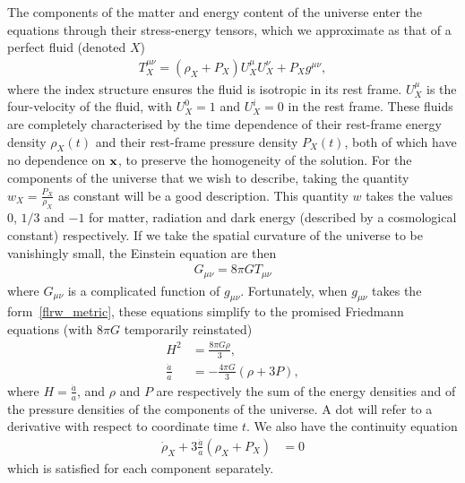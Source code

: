     The components of the matter and energy content of the universe enter the equations through
    their stress-energy tensors, which we approximate as that of
    a perfect fluid (denoted $X$)
    \begin{align}
        T_X^{\mu\nu} = (\rho_X+P_X)U_X^\mu U_X^\nu+P_Xg^{\mu\nu},
    \end{align}
    where the index structure ensures the fluid is isotropic in its rest frame.
    $U_X^\mu$ is the four-velocity of the fluid, with $U_X^0=1$ and $U_X^i=0$
    in the rest frame.
    These fluids are completely characterised by the time dependence
    of their rest-frame energy density $\rho_X(t)$ and their rest-frame
    pressure density $P_X(t)$,
    both of which have no dependence on $\mathbf{x}$, to preserve the homogeneity of the solution.
    For the components of the universe that we wish to describe,
    taking the quantity $w_X=\frac{P_X}{\rho_X}$ as constant will be a good description.
    This quantity $w$ takes the values $0$, $1/3$ and $-1$ for matter, radiation
    and dark energy (described by a cosmological constant) respectively.
    If we take the spatial curvature of the universe to be vanishingly small,
    the Einstein equation are then
    \begin{align}\label{einstein_equations}
        G_{\mu\nu} = 8\pi G T_{\mu\nu}
    \end{align}
    where $G_{\mu\nu}$ is a complicated function of $g_{\mu\nu}$.
    Fortunately, when $g_{\mu\nu}$ takes the form~\eqref{flrw_metric},
    these equations simplify to the promised Friedmann equations
    (with $8\pi G$ temporarily reinstated)
    \begin{align}\label{friedmann_1}
        H^2 &= \frac{8\pi G \rho}{3},\\
        \frac{\ddot{a}}{a} &= -\frac{4\pi G}{3}\left(\rho+3P\right),
    \end{align}
    where $H=\frac{\dot{a}}{a}$, and $\rho$ and $P$ are respectively the sum of the
    energy densities and of the pressure densities of the
    components of the universe.
    A dot will refer to a derivative with respect to coordinate time $t$.
    We also have the continuity equation
    \begin{align}\label{continuity_equation}
        \dot{\rho}_X + 3\frac{\dot{a}}{a}\left(\rho_X+P_X\right) &= 0
    \end{align}
    which is satisfied for each component separately.

